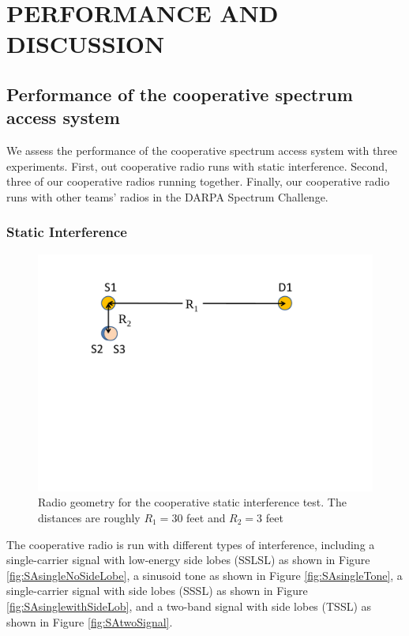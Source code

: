 

%
%

\chapter{PERFORMANCE AND DISCUSSION}
\label{chap:performance}
\section{Performance of the cooperative spectrum access system}
We assess the performance of the cooperative spectrum access system with three experiments. First, out cooperative radio runs with static interference. Second, three of our cooperative radios running together. Finally, our cooperative radio runs with other teams' radios in the DARPA Spectrum Challenge.

\subsection{Static Interference}
\label{staticInterference}
\begin{figure}[tpb]
  \begin{center}
    \centerline{\includegraphics[width=160mm]{CoopTestNodeAssignment.pdf}}
    \caption{Radio geometry for the cooperative static interference test. The distances are roughly $R_1 = 30$ feet and $R_2 = 3$ feet}
    \label{fig:CoopTestNodeAssignment}
  \end{center}
\end{figure}

The cooperative radio is run with different types of interference, including a single-carrier signal with low-energy side lobes (SSLSL) as shown in Figure \ref{fig:SAsingleNoSideLobe}, a sinusoid tone as shown in Figure \ref{fig:SAsingleTone},  a single-carrier signal with side lobes (SSSL) as shown in Figure \ref{fig:SAsinglewithSideLob}, and a two-band signal with side lobes (TSSL) as shown in Figure \ref{fig:SAtwoSignal}.

